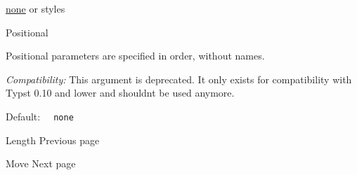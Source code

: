 \href{/docs/reference/foundations/none/}{none} {or} { styles }

{{ Positional }}

\label{parameters-styles-positional-tooltip}
Positional parameters are specified in order, without names.

\emph{Compatibility:} This argument is deprecated. It only exists for
compatibility with Typst 0.10 and lower and shouldn\textquotesingle t be
used anymore.

Default: \texttt{\ }{\texttt{\ none\ }}\texttt{\ }

\href{/docs/reference/layout/length/}{\pandocbounded{}}

{ Length } { Previous page }

\href{/docs/reference/layout/move/}{\pandocbounded{}}

{ Move } { Next page }
